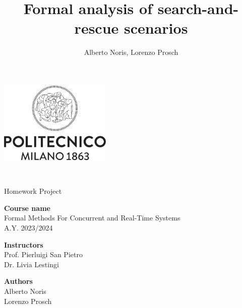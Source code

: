 \documentclass[a4paper,12pt]{article}
\author{Alberto Noris, Lorenzo Prosch}
\title{Formal analysis of search-and-rescue scenarios}
\begin{document}
	
	\begin{center}
		
		\thispagestyle{empty}	%
		
		\includegraphics[width=0.4\textwidth]{root/images/extra/Logo_poli}
		
		\vspace{2cm}
		
		\textbf{\fontsize{32}{\baselineskip}\selectfont {Formal analysis of search-and-rescue scenarios}}\\
		
		\vspace{0.6cm}
		
		\fontsize{18}{\baselineskip}\selectfont Homework Project\\
		
		\vspace{2cm}
		
		\textbf{Course name}\\ 	{
			\setlength{\baselineskip}{1.4\baselineskip}
			Formal Methods For Concurrent and Real-Time Systems\\
			A.Y. 2023/2024\\
		}
		
		\vspace{1cm}
		
		\textbf{Instructors}\\
		{
			\setlength{\baselineskip}{1.4\baselineskip}
			Prof. Pierluigi San Pietro\\
			Dr. Livia Lestingi\\
		}
		
		\vspace{2cm}
		
		\textbf{Authors}\\
		{
			\setlength{\baselineskip}{1.4\baselineskip}
			Alberto Noris\\
			Lorenzo Prosch\\
		}
		
	\end{center}
	
	
	\clearpage
	\hypersetup{linkcolor=black}
	\tableofcontents
	\thispagestyle{empty}
	
	\renewcommand{\rmdefault}{phv}
	\renewcommand{\normalsize}{\fontsize{14}{17.4}\selectfont}

	
	
	
	
	
	
\end{document}
